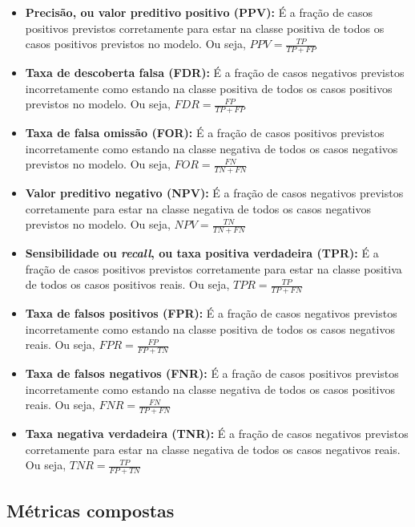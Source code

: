 \documentclass[portugues, 12pt, a4paper]{article}
\begin{document}
\begin{itemize}
\item \textbf{Precisão, ou valor preditivo positivo (PPV):} É a fração de casos positivos previstos corretamente para estar na classe positiva de todos os casos positivos previstos no modelo. Ou seja, $PPV = \frac{TP}{TP + FP}$
\item \textbf{Taxa de descoberta falsa (FDR):} É a fração de casos negativos previstos incorretamente como estando na classe positiva de todos os casos positivos previstos no modelo. Ou seja, $FDR  = \frac{FP}{TP + FP}$
\item \textbf{Taxa de falsa omissão (FOR):} É a fração de casos positivos previstos incorretamente como estando na classe negativa de todos os casos negativos previstos no modelo. Ou seja, $FOR = \frac{FN}{TN + FN}$
\item \textbf{Valor preditivo negativo (NPV):} É a fração de casos negativos previstos corretamente para estar na classe negativa de todos os casos negativos previstos no modelo. Ou seja, $NPV = \frac{TN}{TN + FN}$
\item \textbf{Sensibilidade ou \textit{recall}, ou taxa positiva verdadeira (TPR):} É a fração de casos positivos previstos corretamente para estar na classe positiva de todos os casos positivos reais. Ou seja, $TPR = \frac{TP}{TP + FN}$
\item \textbf{Taxa de falsos positivos (FPR):} É a fração de casos negativos previstos incorretamente como estando na classe positiva de todos os casos negativos reais. Ou seja, $FPR = \frac{FP}{FP + TN}$
\item \textbf{Taxa de falsos negativos (FNR):} É a fração de casos positivos previstos incorretamente como estando na classe negativa de todos os casos positivos reais. Ou seja, $FNR = \frac{FN}{TP + FN}$
\item \textbf{Taxa negativa verdadeira (TNR):} É a fração de casos negativos previstos corretamente para estar na classe negativa de todos os casos negativos reais. Ou seja, $TNR = \frac{TP}{FP + TN}$
\end{itemize}

\subsection{Métricas compostas}
\end{document}
